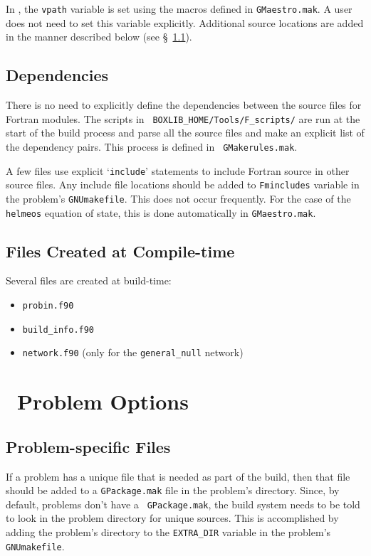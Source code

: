 In \maestro, the {\tt vpath} variable is set using the macros defined
in {\tt GMaestro.mak}.  A user does not need to set this variable
explicitly.  Additional source locations are added in the manner
described below (see \S~\ref{sec:make:otherfiles}).

\subsection{Dependencies}

There is no need to explicitly define the dependencies between the
source files for Fortran modules.  The scripts in {\tt
BOXLIB\_HOME/Tools/F\_scripts/} are run at the start of the build
process and parse all the source files and make an explicit list of
the dependency pairs.  This process is defined in {\tt
GMakerules.mak}.

A few files use explicit `{\tt include}' statements to include Fortran
source in other source files.  Any include file locations should be
added to {\tt Fmincludes} variable in the problem's {\tt GNUmakefile}.
This does not occur frequently.  For the case of the {\tt helmeos}
equation of state, this is done automatically in {\tt GMaestro.mak}.


\subsection{Files Created at Compile-time}

Several files are created at build-time:
\begin{itemize}
\item {\tt probin.f90}

\item {\tt build\_info.f90}

\item {\tt network.f90} (only for the {\tt general\_null} network)
\end{itemize}



\section{\maestro\ Problem Options}

\subsection{Problem-specific Files}
\label{sec:make:otherfiles}

If a problem has a unique file that is needed as part of the build,
then that file should be added to a {\tt GPackage.mak} file in the
problem's directory.  Since, by default, problems don't have a {\tt
GPackage.mak}, the build system needs to be told to look in the
problem directory for unique sources.  This is accomplished by adding
the problem's directory to the {\tt EXTRA\_DIR} variable in the
problem's {\tt GNUmakefile}.  

